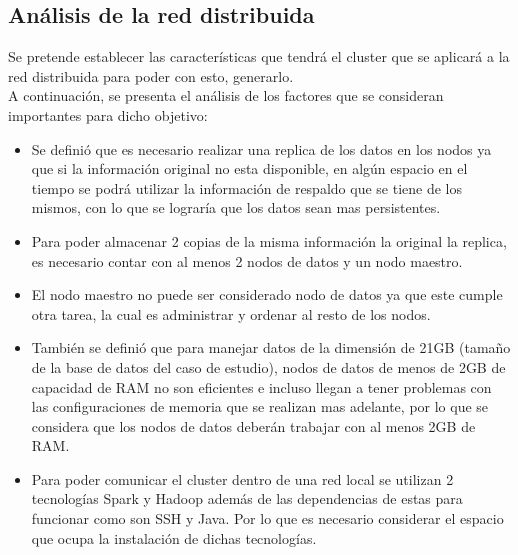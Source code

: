 \subsection{Análisis de la red distribuida}\label{seccion1}
Se pretende establecer las características que tendrá el cluster que se aplicará a la red distribuida para poder con esto, generarlo. 
\\
A continuación, se presenta el análisis de los factores que se consideran importantes para dicho objetivo: 
\\
\begin{itemize}
\item Se definió que es necesario realizar una replica de los datos en los nodos ya que si la información original no esta disponible, en algún espacio en el tiempo se podrá utilizar la información de respaldo que se tiene de los mismos, con lo que se lograría que los datos sean mas persistentes.

\item Para poder almacenar 2 copias de la misma información la original  la replica, es necesario contar con al menos 2 nodos de datos y un nodo maestro. 

\item El nodo maestro no puede ser considerado nodo de datos ya que este cumple otra tarea, la cual es administrar y ordenar al resto de los nodos.

\item También se definió que para manejar datos de la dimensión de 21GB (tamaño de la base de datos del caso de estudio), nodos de datos de menos de 2GB de capacidad de RAM no son eficientes e incluso llegan a tener problemas con las configuraciones de memoria que se realizan mas adelante, por lo que se considera que los nodos de datos deberán trabajar con al menos 2GB de RAM.

\item Para poder comunicar el cluster dentro de una red local se utilizan 2 tecnologías Spark y Hadoop además de las dependencias de estas para funcionar como son SSH y Java. Por lo que es necesario considerar el espacio que ocupa la instalación de dichas tecnologías.

\end{itemize}
